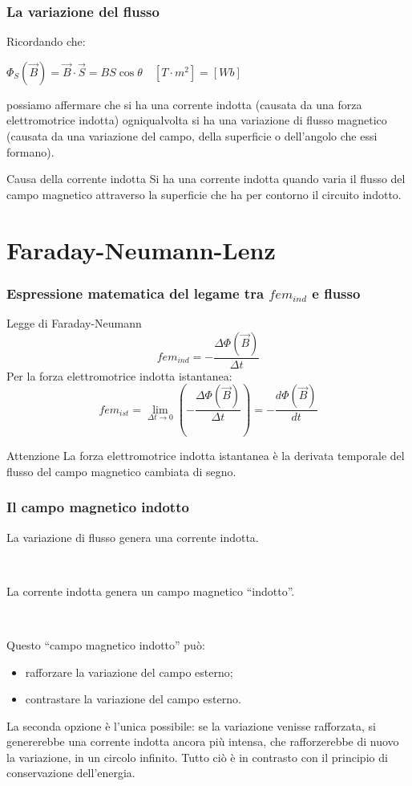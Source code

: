\documentclass[]{beamer}
\theoremstyle{plain}
\begin{document}
\begin{frame}
  \frametitle{La variazione del flusso}
  Ricordando che:
\begin{center}
\colorbox{marroncino!30}{$ \Phi_S (\vec{B}) = \vec{B} \cdot \vec{S} = BS \cos\theta \quad [T \cdot m^2] = [Wb]$}
\end{center}\pause
possiamo affermare che  si ha una corrente indotta (causata da una forza elettromotrice indotta) ogniqualvolta si ha una variazione di flusso magnetico (causata da una variazione del campo, della superficie o dell'angolo che essi formano).\pause
\begin{block}{Causa della corrente indotta}
Si ha una corrente indotta quando varia il flusso del campo magnetico attraverso la superficie che ha per contorno il circuito indotto.
\end{block}
\end{frame}

\section{Faraday-Neumann-Lenz}


\begin{frame}
  \frametitle{Espressione matematica del legame tra $ fem_{ind} $ e flusso}
\begin{block}{Legge di Faraday-Neumann}
\[ fem_{ind} = - \frac{\Delta \Phi(\vec{B})}{\Delta t} \]\pause
Per la forza elettromotrice indotta istantanea:
\[ fem_{ist} = \lim_{\Delta t \rightarrow 0} \left( - \frac{\Delta \Phi(\vec{B})}{\Delta t} \right) = - \frac{d \Phi(\vec{B})}{d t} \]
\end{block}\pause
\begin{alertblock}{Attenzione}
La forza elettromotrice indotta istantanea è la derivata temporale del flusso del campo magnetico cambiata di segno.
\end{alertblock}
\end{frame}

\begin{frame}
  \frametitle{Il campo magnetico indotto}
  La variazione di flusso genera una corrente indotta.\pause

  ~
  
  La corrente indotta genera un campo magnetico ``indotto''.\pause

  ~
  
  Questo ``campo magnetico indotto'' può:
  \begin{itemize}
    \item rafforzare la variazione del campo esterno;\pause
    \item contrastare la variazione del campo esterno.\pause
  \end{itemize}
  \alert{La seconda opzione è l'unica possibile}: se la variazione venisse rafforzata, si genererebbe una corrente indotta ancora più intensa, che rafforzerebbe di nuovo la variazione, in un circolo infinito. Tutto ciò è in contrasto con il principio di conservazione dell'energia.
\end{frame}
\end{document}
